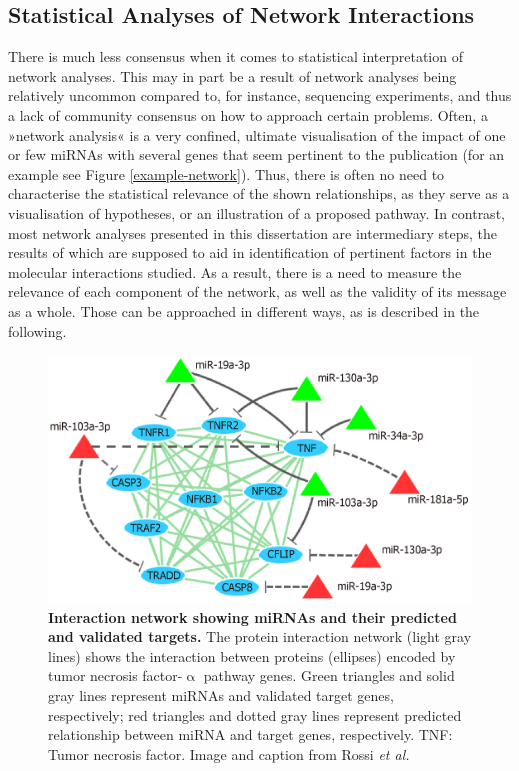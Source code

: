 \subsection{Statistical Analyses of Network Interactions} \label{sec:discussion:network-statistics}
There is much less consensus when it comes to statistical interpretation of network analyses. This may in part be a result of network analyses being relatively uncommon compared to, for instance, sequencing experiments, and thus a lack of community consensus on how to approach certain problems. Often, a »network analysis« is a very confined, ultimate visualisation of the impact of one or few miRNAs with several genes that seem pertinent to the publication (for an example see Figure \ref{example-network}). Thus, there is often no need to characterise the statistical relevance of the shown relationships, as they serve as a visualisation of hypotheses, or an illustration of a proposed pathway. In contrast, most network analyses presented in this dissertation are intermediary steps, the results of which are supposed to aid in identification of pertinent factors in the molecular interactions studied. As a result, there is a need to measure the relevance of each component of the network, as well as the validity of its message as a whole. Those can be approached in different ways, as is described in the following.

\begin{figure}
\centering
\includegraphics[width=.6\textwidth]{figures/example-network}
\caption[miRNA-Interaction Network Example.]{\textbf{Interaction network showing miRNAs and their predicted and validated targets.} The protein interaction network (light gray lines) shows the interaction between proteins (ellipses) encoded by tumor necrosis factor-$\upalpha$ pathway genes. Green triangles and solid gray lines represent miRNAs and validated target genes, respectively; red triangles and dotted gray lines represent predicted relationship between miRNA and target genes, respectively. TNF: Tumor necrosis factor. Image and caption from Rossi \emph{et al.}\cite{Rossi2019}
\label{fig:example-network}}
\end{figure}

